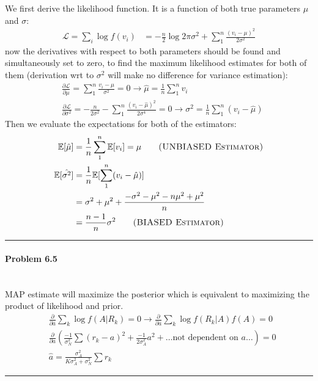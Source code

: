 \documentclass[12pt, letterpaper]{scrartcl}
\begin{document}
We first derive the likelihood function. It is a function of both true parameters $\mu$ and $\sigma$:
\begin{align*}
    \mathcal{L}=\sum_i\log f(v_i)&=-\frac{n}{2}\log2\pi\sigma^2+\sum_1^n\frac{(v_i-\mu)^2}{2\sigma^2}
\end{align*}
now the derivatives with respect to both parameters should be found and simultaneously set to zero, to find the maximum likelihood estimates for both of them (derivation wrt to $\sigma^2$ will make no difference for variance estimation):
\begin{align*}
    &\frac{\partial\mathcal{L}}{\partial\mu}=\sum_1^n\frac{v_i-\mu}{\sigma^2}=0 \longrightarrow \hat{\mu}=\frac{1}{n}\sum_1^nv_i\\
    &\frac{\partial\mathcal{L}}{\partial\sigma^2}=-\frac{n}{2\sigma^2}-\sum_1^n\frac{(v_i-\hat{\mu})^2}{2\sigma^4}=0 \longrightarrow \hat{\sigma^2}=\frac{1}{n}\sum_1^n(v_i-\hat{\mu})
\end{align*}
Then we evaluate the expectations for both of the estimators:
\begin{align*}
    \mathbb{E}[\hat{\mu}]&=\frac{1}{n}\sum_1^n\mathbb{E}[v_i]=\mu \qquad \textsc{(UNBIASED Estimator)}\\
    \mathbb{E}[\hat{\sigma^2}]&=\frac{1}{n}\mathbb{E}[\sum_1^n(v_i-\hat{\mu})]\\
    &=\sigma^2+\mu^2+\frac{-\sigma^2-\mu^2-n\mu^2+\mu^2}{n}\\
    &=\frac{n-1}{n}\sigma^2 \qquad\textsc{(BIASED Estimator)}
\end{align*}

\hrule

\paragraph*{Problem 6.5} \hfill\\

MAP estimate will maximize the posterior which is equivalent to maximizing the product of likelihood and prior.
\begin{align*}
    &\frac{\partial}{\partial a}\sum_k\log f(A|R_k)=0 \longrightarrow \frac{\partial}{\partial a}\sum_k\log f(R_k|A)f(A)=0\\
    &\frac{\partial}{\partial a}(\frac{-1}{\sigma_N^2}\sum(r_k-a)^2+\frac{-1}{2\sigma_A^2}a^2+\dots \text{not dependent on }a\dots)=0\\
    &\hat{a}=\frac{\sigma_A^2}{K\sigma_A^2+\sigma_N^2}\sum r_k
\end{align*}

\hrule
\end{document}
